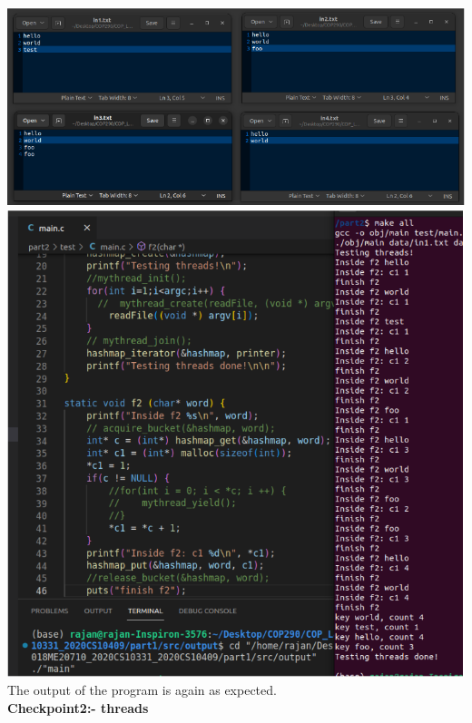 \documentclass[12pt]{article}
\begin{document}
\begin{spacing}{1.2}
\includegraphics[width=14cm]{images/12.png}\\
\includegraphics[width=18cm]{images/13.png}\\
The output of the program is again as expected.\\


\textbf{Checkpoint2:- threads}


\end{spacing}
\end{document}
